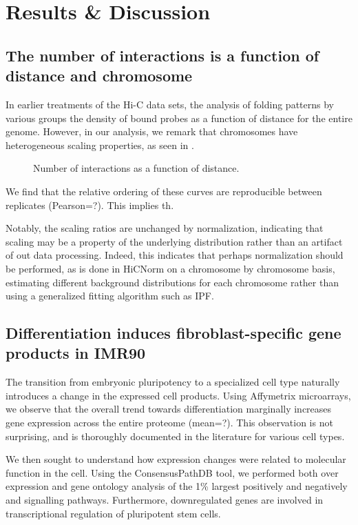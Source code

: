 
\chapter{Results \& Discussion}

\section*{The number of interactions is a function of distance and chromosome}
In earlier treatments of the Hi-C data sets, the analysis of folding patterns by various groups\cite{imakaev2012}\cite{ren2013}
the density of bound probes as a function of distance for the entire genome.  However, in our analysis, we remark that chromosomes
have heterogeneous scaling properties, as seen in .  

\begin{figure}[ht]
  \caption{Number of interactions as a function of distance.}
\end{figure}

We find that the relative ordering of these curves are reproducible between replicates (Pearson=?).  This implies th.

Notably, the scaling ratios are unchanged by normalization, indicating that scaling may be a property of the underlying distribution
rather than an artifact of out data processing.  Indeed, this indicates that perhaps normalization should be performed, as is
done in HiCNorm\cite{} on a chromosome by chromosome basis, estimating different background distributions for each chromosome
rather than using a generalized fitting algorithm such as IPF.


\section*{Differentiation induces fibroblast-specific gene products in IMR90}

The transition from embryonic pluripotency to a specialized cell type naturally introduces a change in the expressed cell products.
Using Affymetrix microarrays, we observe that the overall trend towards differentiation marginally increases gene expression across
the entire proteome (mean=?).  This observation is not surprising, and is thoroughly documented in the literature\cite{tuomela2012}
for various cell types.

We then sought to understand how expression changes were related to molecular function in the cell.  Using the ConsensusPathDB
tool\cite{kamburov2012}, we performed both over expression and gene ontology analysis of the 1\%  largest positively and negatively
and signalling pathways.  Furthermore, downregulated genes are involved in transcriptional regulation of pluripotent stem cells.

